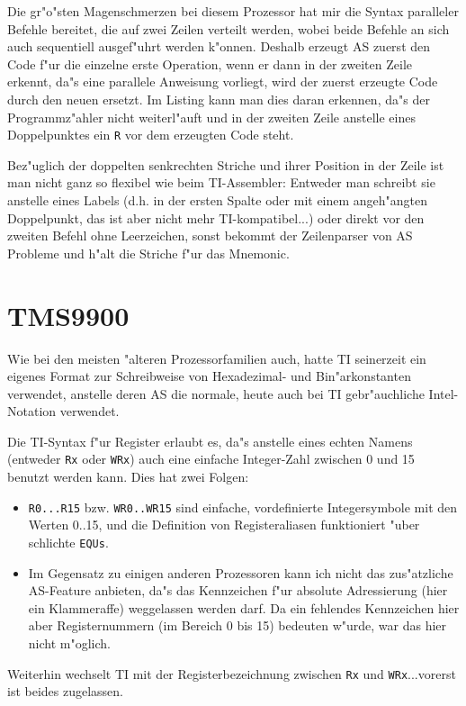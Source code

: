 \documentclass[12pt,a4paper,twoside]{report}
\newcommand{\tty}[1]{{\tt #1}}
\newcommand{\asname}{AS}
\begin{document}
Die gr"o"sten Magenschmerzen bei diesem Prozessor hat mir die Syntax
paralleler Befehle bereitet, die auf zwei Zeilen verteilt werden,
wobei beide Befehle an sich auch sequentiell ausgef"uhrt werden k"onnen.
Deshalb erzeugt \asname{} zuerst den Code f"ur die einzelne erste Operation,
wenn er dann in der zweiten Zeile erkennt, da"s eine parallele Anweisung
vorliegt, wird der zuerst erzeugte Code durch den neuen ersetzt.
Im Listing kann man dies daran erkennen, da"s der Programmz"ahler
nicht weiterl"auft und in der zweiten Zeile anstelle eines Doppelpunktes
ein \tty{R} vor dem erzeugten Code steht.
\par
Bez"uglich der doppelten senkrechten Striche und ihrer Position in der
Zeile ist man nicht ganz so flexibel wie beim TI-Assembler: Entweder
man schreibt sie anstelle eines Labels (d.h. in der ersten Spalte oder
mit einem angeh"angten Doppelpunkt, das ist aber nicht mehr
TI-kompatibel...) oder direkt vor den zweiten Befehl ohne Leerzeichen,
sonst bekommt der Zeilenparser von \asname{} Probleme und h"alt die Striche
f"ur das Mnemonic.


\section{TMS9900}

Wie bei den meisten "alteren Prozessorfamilien auch, hatte TI seinerzeit
ein eigenes Format zur Schreibweise von Hexadezimal- und Bin"arkonstanten
verwendet, anstelle deren \asname{} die normale, heute auch bei TI
gebr"auchliche Intel-Notation verwendet.

Die TI-Syntax f"ur Register erlaubt es, da"s anstelle eines echten Namens
(entweder \tty{Rx} oder \tty{WRx}) auch eine einfache Integer-Zahl
zwischen 0 und 15 benutzt werden kann.  Dies hat zwei Folgen:
\begin{itemize}
\item{\tty{R0...R15} bzw. \tty{WR0..WR15} sind einfache, vordefinierte
      Integersymbole mit den Werten 0..15, und die Definition von
      Registeraliasen funktioniert "uber schlichte \tty{EQUs}.}
\item{Im Gegensatz zu einigen anderen Prozessoren kann ich nicht das
      zus"atzliche \asname{}-Feature anbieten, da"s das Kennzeichen f"ur
      absolute Adressierung (hier ein Klammeraffe) weggelassen werden
      darf.  Da ein fehlendes Kennzeichen hier aber Registernummern (im
      Bereich 0 bis 15) bedeuten w"urde, war das hier nicht m"oglich.}
\end{itemize}
Weiterhin wechselt TI mit der Registerbezeichnung zwischen \tty{Rx} und
\tty{WRx}...vorerst ist beides zugelassen.
\end{document}
